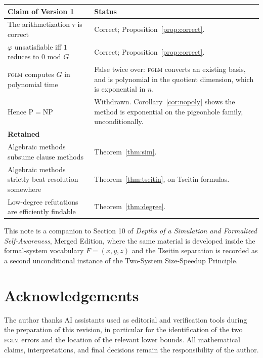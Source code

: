 \documentclass[11pt]{article}
\theoremstyle{plain}
\theoremstyle{definition}
\theoremstyle{remark}
\begin{document}
\begin{center}
\begin{tabular}{@{}p{}p{}@{}}
\hline
\textbf{Claim of Version 1} & \textbf{Status} \\
\hline
The arithmetization $\tau$ is correct
& Correct; Proposition~\ref{prop:correct}. \\
$\varphi$ unsatisfiable iff $1$ reduces to $0$ mod $G$
& Correct; Proposition~\ref{prop:correct}. \\
\textsc{fglm} computes $G$ in polynomial time
& False twice over: \textsc{fglm} converts an existing basis, and is polynomial in the quotient dimension, which is exponential in $n$. \\
Hence $\mathrm{P}=\mathrm{NP}$
& Withdrawn. Corollary~\ref{cor:nopoly} shows the method is exponential on the pigeonhole family, unconditionally. \\
\hline
\textbf{Retained} & \\
\hline
Algebraic methods subsume clause methods
& Theorem~\ref{thm:sim}. \\
Algebraic methods strictly beat resolution somewhere
& Theorem~\ref{thm:tseitin}, on Tseitin formulas. \\
Low-degree refutations are efficiently findable
& Theorem~\ref{thm:degree}. \\
\hline
\end{tabular}
\end{center}

\bigskip
\noindent This note is a companion to Section 10 of \emph{Depths of a
Simulation and Formalized Self-Awareness}, Merged Edition, where the same
material is developed inside the formal-system vocabulary $F=(x,y,z)$ and the
Tseitin separation is recorded as a second unconditional instance of the
Two-System Size-Speedup Principle.

\section*{Acknowledgements}
The author thanks AI assistants used as editorial and verification tools during
the preparation of this revision, in particular for the identification of the
two \textsc{fglm} errors and the location of the relevant lower bounds. All
mathematical claims, interpretations, and final decisions remain the
responsibility of the author.
\end{document}
